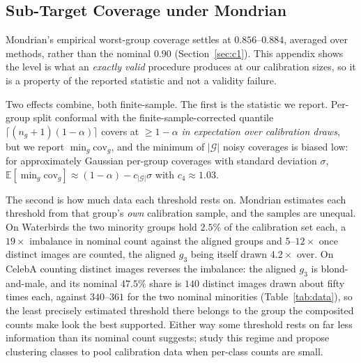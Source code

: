 \documentclass[pdflatex,sn-basic]{sn-jnl}%
\theoremstyle{thmstyleone}%
\newcommand{\cov}{\mathrm{cov}}
\begin{document}
\begin{appendices}


\section{Sub-Target Coverage under Mondrian}
\label{app:subtarget}

Mondrian's empirical worst-group coverage settles at $0.856$--$0.884$, averaged over methods,
rather than the nominal $0.90$ (Section~\ref{sec:c1}). This appendix shows the level is what an
\emph{exactly valid} procedure produces at our calibration sizes, so it is a property
of the reported statistic and not a validity failure.

Two effects combine, both finite-sample. The first is the statistic we report. Per-group split
conformal with the finite-sample-corrected quantile $\lceil(n_g+1)(1-\alpha)\rceil$ covers at
$\ge1-\alpha$ \emph{in expectation over calibration draws}, but we report $\min_g\cov_g$, and the
minimum of $|\mathcal{G}|$ noisy coverages is biased low: for approximately Gaussian per-group
coverages with standard deviation $\sigma$, $\mathbb{E}[\min_g\cov_g]\approx
(1-\alpha)-c_{|\mathcal{G}|}\sigma$ with $c_4\approx1.03$.

The second is how much data each threshold rests on. Mondrian estimates each threshold from that
group's \emph{own} calibration sample, and the samples are unequal. On Waterbirds the two minority groups hold $2.5\%$ of the
calibration set each, a $19\times$ imbalance in nominal count against the aligned groups and
$5$--$12\times$ once distinct images are counted, the aligned $g_3$ being itself drawn $4.2\times$
over. On CelebA counting distinct images reverses the imbalance: the aligned $g_3$ is
blond-and-male, and its nominal $47.5\%$ share is $140$ distinct images drawn about fifty times
each, against $340$--$361$ for the two nominal minorities (Table~\ref{tab:data}), so the least
precisely estimated threshold there belongs to the group the composited counts make look the best
supported. Either way some threshold rests on far less information than its nominal count
suggests; \citet{ding2023classcond} study this regime and propose clustering classes to pool
calibration data when per-class counts are small.


\end{appendices}
\end{document}
